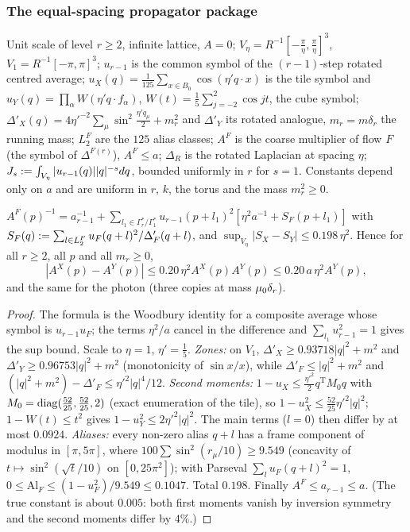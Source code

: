 
\subsubsection*{The equal-spacing propagator package}

Unit scale of level $r\ge2$, infinite lattice, $A=0$; $V_\eta=R^{-1}[-\frac\pi\eta,\frac\pi\eta]^3$, $V_1=R^{-1}[-\pi,\pi]^3$; $u_{r-1}$ is the common symbol of the $(r-1)$-step rotated centred average; $u_X(q)=\frac1{125}\sum_{x\in B_0}\cos(\eta'q\cdot x)$ is the tile symbol and $u_Y(q)=\prod_\alpha W(\eta'q\cdot f_\alpha)$, $W(t)=\frac15\sum_{j=-2}^2\cos jt$, the cube symbol; $\Delta'_X(q)=4\eta'^{-2}\sum_\mu\sin^2\frac{\eta'q_\mu}2+m_r^2$ and $\Delta'_Y$ its rotated analogue, $m_r=m\delta_r$ the running mass; $L^F_2$ are the $125$ alias classes; $A^F$ is the coarse multiplier of flow $F$ (the symbol of $\Delta^{F(r)}$), $A^F\le a$; $\Delta_R$ is the rotated Laplacian at spacing $\eta$; $J_s:=\int_{V_\eta}|u_{r-1}(q)||q|^{-s}dq$, bounded uniformly in $r$ for $s=1$. Constants depend only on $a$ and are uniform in $r$, $k$, the torus and the mass $m_r^2\ge0$.

\begin{proposition}\label{rot:prop:fc}
$A^F(p)^{-1}=a_{r-1}^{-1}+\sum_{l_1\in\Gamma_r^*/\Gamma_1^*}u_{r-1}(p+l_1)^2[\eta^2a^{-1}+S_F(p+l_1)]$ with $S_F(q):=\sum_{l\in L^F_2}u_F(q+l)^2/\Delta'_F(q+l)$, and $\sup_{V_\eta}|S_X-S_Y|\le0.198\,\eta^2$. Hence for all $r\ge2$, all $p$ and all $m_r\ge0$,
\[
|A^X(p)-A^Y(p)|\le0.20\,\eta^2A^X(p)A^Y(p)\le0.20\,a\,\eta^2A^Y(p),
\]
and the same for the photon (three copies at mass $\mu_0\delta_r$).
\end{proposition}
\begin{proof}
The formula is the Woodbury identity for a composite average whose symbol is $u_{r-1}u_F$; the terms $\eta^2/a$ cancel in the difference and $\sum_{l_1}u_{r-1}^2=1$ gives the sup bound. Scale to $\eta=1$, $\eta'=\frac15$. \emph{Zones:} on $V_1$, $\Delta'_X\ge0.93718|q|^2+m^2$ and $\Delta'_Y\ge0.96753|q|^2+m^2$ (monotonicity of $\sin x/x$), while $\Delta'_F\le|q|^2+m^2$ and $(|q|^2+m^2)-\Delta'_F\le\eta'^2|q|^4/12$. \emph{Second moments:} $1-u_X\le\frac{\eta'^2}2q^{\mathrm T}M_0q$ with $M_0=\operatorname{diag}(\frac{52}{25},\frac{52}{25},2)$ (exact enumeration of the tile), so $1-u_X^2\le\frac{52}{25}\eta'^2|q|^2$; $1-W(t)\le t^2$ gives $1-u_Y^2\le2\eta'^2|q|^2$. The main terms ($l=0$) then differ by at most $0.0924$. \emph{Aliases:} every non-zero alias $q+l$ has a frame component of modulus in $[\pi,5\pi]$, where $100\sum\sin^2(r_\mu/10)\ge9.549$ (concavity of $t\mapsto\sin^2(\sqrt t/10)$ on $[0,25\pi^2]$); with Parseval $\sum_lu_F(q+l)^2=1$, $0\le\mathrm{Al}_F\le(1-u_F^2)/9.549\le0.1047$. Total $0.198$. Finally $A^F\le a_{r-1}\le a$. (The true constant is about $0.005$: both first moments vanish by inversion symmetry and the second moments differ by $4\%$.)
\end{proof}

